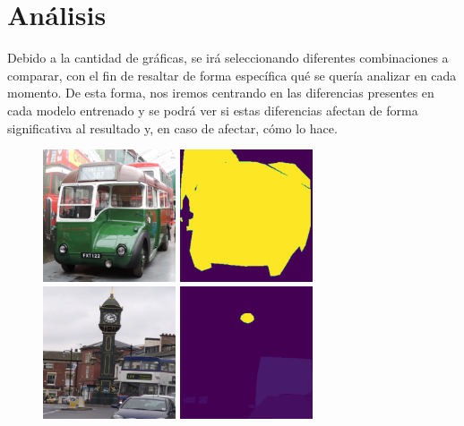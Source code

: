 \section{Análisis}

Debido a la cantidad de gráficas, se irá seleccionando diferentes combinaciones a comparar, con el fin de resaltar de forma específica qué se quería analizar en cada momento. De esta forma, nos iremos centrando en las diferencias presentes en cada modelo entrenado y se podrá ver si estas diferencias afectan de forma significativa al resultado y, en caso de afectar, cómo lo hace.\\
\begin{figure}[h]
  \centering
  \includegraphics[width=0.35\textwidth]{../../modelos-entrenados/unet-conv/ejecucion12/img1}
  \vrule
  \includegraphics[width=0.35\textwidth]{../../modelos-entrenados/unet-conv/ejecucion12/img-ann1}
  \vrule
  \includegraphics[width=0.35\textwidth]{../../modelos-entrenados/unet-conv/ejecucion12/val2}
  \vrule
  \includegraphics[width=0.35\textwidth]{../../modelos-entrenados/unet-conv/ejecucion12/val-ann2}

\end{figure}
